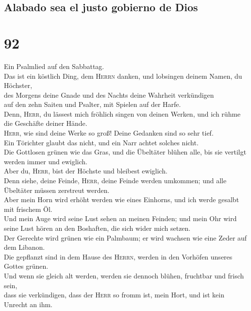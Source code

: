 \hypertarget{alabado-sea-el-justo-gobierno-de-dios}{%
\subsection{Alabado sea el justo gobierno de
Dios}\label{alabado-sea-el-justo-gobierno-de-dios}}

\hypertarget{section-91}{%
\section{92}\label{section-91}}

 Ein Psalmlied auf den Sabbattag.\\
 Das ist ein köstlich Ding, dem \textsc{Herrn} danken, und
lobsingen deinem Namen, du Höchster,\\
 des Morgens deine Gnade und des Nachts deine Wahrheit
verkündigen\\
 auf den zehn Saiten und Psalter, mit Spielen auf der
Harfe.\\
 Denn, \textsc{Herr}, du lässest mich fröhlich singen von
deinen Werken, und ich rühme die Geschäfte deiner Hände.\\
 \textsc{Herr}, wie sind deine Werke so groß! Deine
Gedanken sind so sehr tief.\\
 Ein Törichter glaubt das nicht, und ein Narr achtet
solches nicht.\\
 Die Gottlosen grünen wie das Gras, und die Übeltäter
blühen alle, bis sie vertilgt werden immer und ewiglich.\\
 Aber du, \textsc{Herr}, bist der Höchste und bleibest
ewiglich.\\
 Denn siehe, deine Feinde, \textsc{Herr}, deine Feinde
werden umkommen; und alle Übeltäter müssen zerstreut werden.\\
 Aber mein Horn wird erhöht werden wie eines Einhorns,
und ich werde gesalbt mit frischem Öl.\\
 Und mein Auge wird seine Lust sehen an meinen Feinden;
und mein Ohr wird seine Lust hören an den Boshaften, die sich wider mich
setzen.\\
 Der Gerechte wird grünen wie ein Palmbaum; er wird
wachsen wie eine Zeder auf dem Libanon.\\
 Die gepflanzt sind in dem Hause des \textsc{Herrn},
werden in den Vorhöfen unseres Gottes grünen.\\
 Und wenn sie gleich alt werden, werden sie dennoch
blühen, fruchtbar und frisch sein,\\
 dass sie verkündigen, dass der \textsc{Herr} so fromm
ist, mein Hort, und ist kein Unrecht an ihm.

